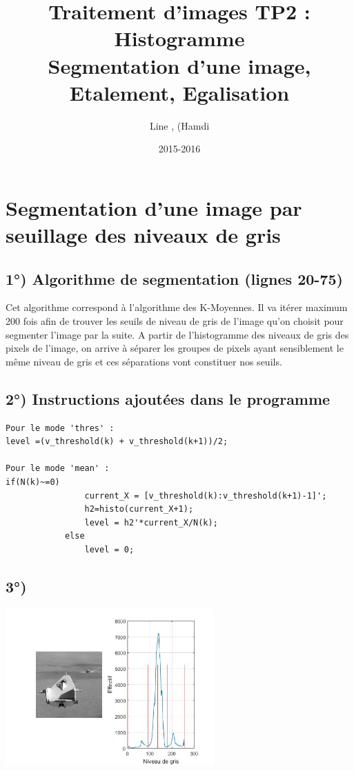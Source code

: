 \documentclass{article}
\title{Traitement d'images TP2 : Histogramme\\Segmentation d'une image, Etalement, Egalisation}
\author{Line \bsc{POUVARET}, (Hamdi \bsc{BENAOUI)}}
\date{2015-2016}
\begin{document}
\maketitle

\section*{Segmentation d’une image par seuillage des niveaux de gris}
\subsection*{1°) Algorithme de segmentation (lignes 20-75)}

Cet algorithme correspond à l’algorithme des K-Moyennes. Il va itérer maximum 200 fois afin de trouver les seuils de niveau de gris de l’image qu’on choisit pour segmenter l’image par la suite. A partir de l’histogramme des niveaux de gris des pixels de l’image,  on arrive à séparer les groupes de pixels ayant sensiblement le même niveau de gris et ces séparations vont constituer nos seuils.

\subsection*{2°) Instructions ajoutées dans le programme}
\begin{lstlisting}
Pour le mode 'thres' :
level =(v_threshold(k) + v_threshold(k+1))/2;

Pour le mode 'mean' :
if(N(k)~=0)
                current_X = [v_threshold(k):v_threshold(k+1)-1]';
                h2=histo(current_X+1);
                level = h2'*current_X/N(k);
            else
                level = 0; 
\end{lstlisting}

\subsection*{3°)} \includegraphics[width=8cm]{liftingbody_avant.jpg}
\end{document}

